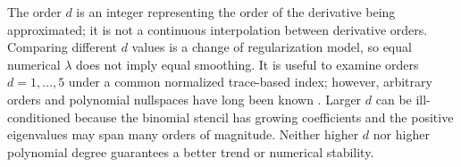 The order $d$ is an integer representing the order of the derivative
being approximated; it is not a continuous interpolation between
derivative orders. Comparing different $d$ values is a change of
regularization model, so equal numerical $\lambda$ does not
imply equal smoothing. It is useful to examine orders
$d=1,\ldots,5$ under a common normalized trace-based index;
however, arbitrary orders and polynomial nullspaces have long been
known \cite{weinert2007wh,biessy2026wh}. Larger $d$ can be
ill-conditioned because the binomial stencil has growing coefficients
and the positive eigenvalues may span many orders of magnitude.
Neither higher $d$ nor higher polynomial degree guarantees a better
trend or numerical stability.
